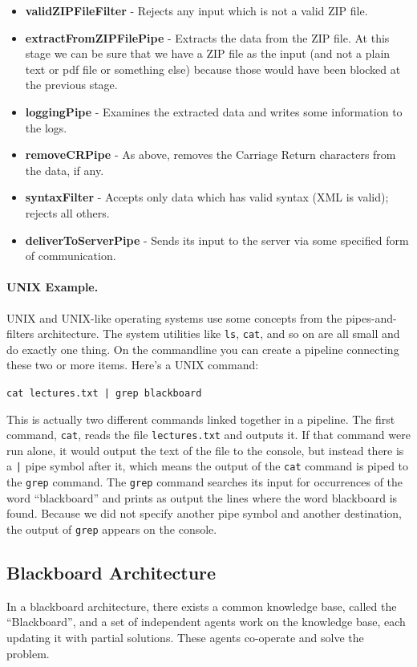 \begin{itemize}
	\item \textbf{validZIPFileFilter} - Rejects any input which is not a valid ZIP file.
	\item \textbf{extractFromZIPFilePipe} - Extracts the data from the ZIP file. At this stage we can be sure that we have a ZIP file as the input (and not a plain text or pdf file or something else) because those would have been blocked at the previous stage.
	\item \textbf{loggingPipe} - Examines the extracted data and writes some information to the logs. 
	\item \textbf{removeCRPipe} - As above, removes the Carriage Return characters from the data, if any.
	\item \textbf{syntaxFilter} - Accepts only data which has valid syntax (XML is valid); rejects all others.
	\item \textbf{deliverToServerPipe} - Sends its input to the server via some specified form of communication.
\end{itemize}

\paragraph{UNIX Example.} UNIX and UNIX-like operating systems use some concepts from the pipes-and-filters architecture. The system utilities like \texttt{ls}, \texttt{cat}, and so on are all small and do exactly one thing. On the commandline you can create a pipeline connecting these two or more items. Here's a UNIX command:

\texttt{cat lectures.txt | grep blackboard}

This is actually two different commands linked together in a pipeline. The first command, \texttt{cat}, reads the file \texttt{lectures.txt} and outputs it. If that command were run alone, it would output the text of the file to the console, but instead there is a \texttt{|} pipe symbol after it, which means the output of the \texttt{cat} command is piped to the \texttt{grep} command. The \texttt{grep} command searches its input for occurrences of the word ``blackboard'' and prints as output the lines where the word blackboard is found. Because we did not specify another pipe symbol and another destination, the output of \texttt{grep} appears on the console.


\subsection*{Blackboard Architecture}
In a blackboard architecture, there exists a common knowledge base, called the ``Blackboard'', and a set of independent agents work on the knowledge base, each updating it with partial solutions. These agents co-operate and solve the problem.

